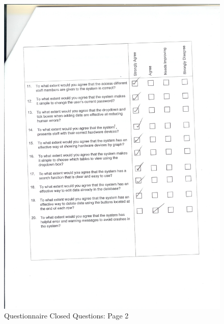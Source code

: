 \begin{figure}[H]
    \includegraphics[width=\textwidth]{./Evaluation/EvaluationQuestionnaire/Scan11.jpeg}
    \caption{Questionnaire Closed Questions: Page 2}
\end{figure}


